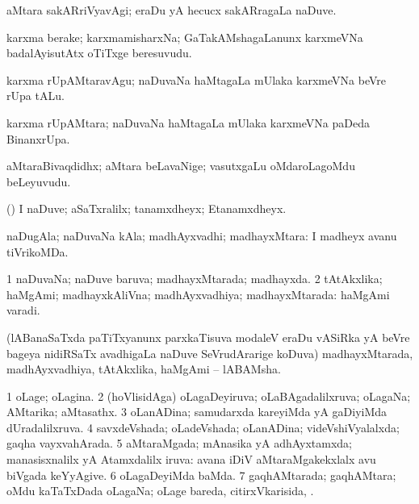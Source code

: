 \bentry
{}
\gl{\kirxvi}
\bmng
aMtara sakARriVyavAgi; eraDu yA hecucx sakARragaLa naDuve. 
\emng
\eentry

\bentry
{}
\gl{\nA}
\bmng
karxma berake; karxmamisharxNa; GaTakAMshagaLanunx karxmeVNa badalAyisutAtx oTiTxge beresuvudu. 
\emng
\eentry

\bentry
{}
\gl{\akirx}
\bmng
karxma rUpAMtaravAgu; naDuvaNa haMtagaLa mUlaka karxmeVNa beVre rUpa tALu. 
\emng
\eentry

\bentry
{}
\gl{\nA}
\bmng
karxma rUpAMtara; naDuvaNa haMtagaLa mUlaka karxmeVNa paDeda BinanxrUpa. 
\emng
\eentry

\bentry
{}
\gl{\nA}
\bmng
aMtaraBivaqdidhx; aMtara beLavaNige; vasutxgaLu oMdaroLagoMdu beLeyuvudu. 
\emng
\eentry

\bentry
{}
\gl{\kirxvi}
\bmng
(\pArxparx) I naDuve; aSaTxralilx; tanamxdheyx; Etanamxdheyx. 
\emng
\eentry

\bentry
{}
\gl{\nA}
\bmng
naDugAla; naDuvaNa kAla; madhAyxvadhi; madhayxMtara:  I madheyx avanu tiVrikoMDa. 
\emng
\eentry

\bentry
{}
\gl{\gu}
\bmng
\bnum
\num{1} naDuvaNa; naDuve baruva; madhayxMtarada; madhayxda. 
\num{2} tAtAkxlika; haMgAmi; madhayxkAliVna; madhAyxvadhiya; madhayxMtarada:  haMgAmi varadi. 
\enum
\emng
\eentry

\bentry
{}
\gl{\nA}
\bmng
(lABanaSaTxda paTiTxyanunx parxkaTisuva modaleV eraDu vASiRka yA beVre bageya nidiRSaTx avadhigaLa naDuve SeVrudArarige koDuva) madhayxMtarada, madhAyxvadhiya, tAtAkxlika, haMgAmi -- lABAMsha. 
\emng
\eentry

\bentry
{}
\gl{\gu}
\bmng
\bnum
\num{1} oLage; oLagina. 
\num{2} (hoVlisidAga) oLagaDeyiruva; oLaBAgadalilxruva; oLagaNa; AMtarika; aMtasathx. 
\num{3} oLanADina; samudarxda kareyiMda yA gaDiyiMda dUradalilxruva. 
\num{4} savxdeVshada; oLadeVshada; oLanADina; videVshiVyalalxda; gaqha vayxvahArada. 
\num{5} aMtaraMgada; mAnasika yA adhAyxtamxda; manasisxnalilx yA Atamxdalilx iruva:  avana iDiV aMtaraMgakekxlalx avu biVgada keYyAgive. 
\num{6} oLagaDeyiMda baMda. 
\num{7} gaqhAMtarada; gaqhAMtara; oMdu kaTaTxDada oLagaNa; oLage bareda, citirxVkarisida, \mo. 
\enum
\emng
\eentry

